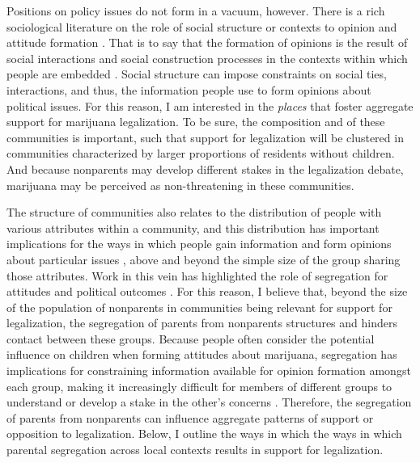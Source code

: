 Positions on policy issues do not form in a vacuum, however. There is a rich sociological literature on the role of social structure or contexts to opinion and attitude formation \citep{blau_1977a,blau_1977b,mcveigh_and_sobolewski_2007,mcveigh_and_diaz_2009}. That is to say that the formation of opinions is the result of social interactions and social construction processes in the contexts within which people are embedded \citep{mcveigh_and_sobolewski_2007,mcveigh_and_diaz_2009}. Social structure can impose constraints on social ties, interactions, and thus, the information people use to form opinions about political issues. For this reason, I am interested in the \textit{places} that foster aggregate support for marijuana legalization. To be sure, the composition and of these communities is important, such that support for legalization will be clustered in communities characterized by larger proportions of residents without children. And because nonparents may develop different stakes in the legalization debate, marijuana may be perceived as non-threatening in these communities. 

The structure of communities also relates to the distribution of people with various attributes within a community, and this distribution has important implications for the ways in which people gain information and form opinions about particular issues  \citep{blau_1977b}, above and beyond the simple size of the group sharing those attributes. Work in this vein has highlighted the role of segregation for attitudes and political outcomes \citep{olzak_et_al_1994,andrews_and_seguin_2015}. For this reason, I believe that, beyond the size of the population of nonparents in communities being relevant for support for legalization, the segregation of parents from nonparents structures and hinders contact between these groups. Because people often consider the potential influence on children when forming attitudes about marijuana, segregation has implications for constraining information available for opinion formation amongst each group, making it increasingly difficult for members of different groups to understand or develop a stake in the other's concerns \citep{herek_and_capitanio_1996}. Therefore, the segregation of parents from nonparents can influence aggregate patterns of support or opposition to legalization. Below, I outline the ways in which the ways in which parental segregation across local contexts results in support for legalization. 





